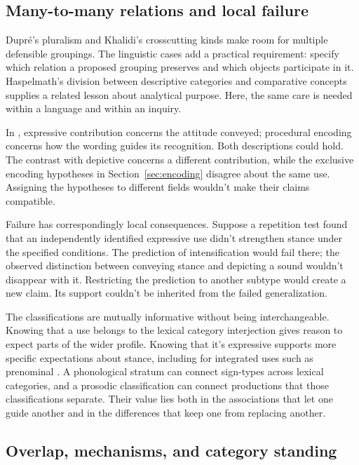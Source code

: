 \documentclass[12pt]{article}
\begin{document}
\subsection{Many-to-many relations and local failure}

Dupr\'e's pluralism and Khalidi's crosscutting kinds make room for
multiple defensible groupings. The linguistic cases add a practical
requirement: specify which relation a proposed grouping preserves and
which objects participate in it. Haspelmath's division between descriptive
categories and comparative concepts supplies a related lesson about
analytical purpose. Here, the same care is needed within a language
and within an inquiry.

In , expressive contribution concerns
the attitude conveyed; procedural encoding concerns how the wording
guides its recognition. Both descriptions could hold. The contrast with
depictive  concerns a different contribution, while the
exclusive encoding hypotheses in Section~\ref{sec:encoding} disagree about
the same use. Assigning the hypotheses to different fields wouldn't
make their claims compatible.

Failure has correspondingly local consequences. Suppose a repetition
test found that an independently identified expressive use didn't
strengthen stance under the specified conditions. The prediction of
intensification would fail there; the observed distinction between
conveying stance and depicting a sound wouldn't disappear with it.
Restricting the prediction to another subtype would create a new
claim. Its support couldn't be inherited from the failed generalization.

The classifications are mutually informative without being interchangeable.
Knowing that a use belongs to the lexical category interjection gives
reason to expect parts of the wider profile. Knowing that it's expressive
supports more specific expectations about stance, including for integrated
uses such as prenominal . A phonological stratum can connect
sign-types across lexical categories, and a prosodic classification can
connect productions that those classifications separate. Their value lies
both in the associations that let one guide another and in the
differences that keep one from replacing another.

\subsection{Overlap, mechanisms, and category standing}
\end{document}
